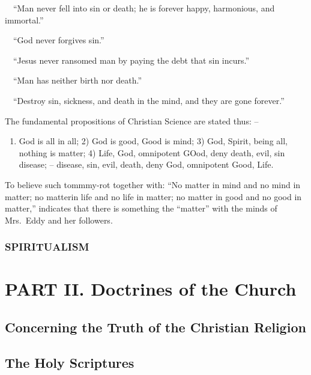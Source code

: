 \documentclass[
]{book}
\providecommand{\tightlist}{%
  \setlength{\itemsep}{0pt}\setlength{\parskip}{0pt}}
\begin{document}
~~``Man never fell into sin or death; he is forever happy, harmonious, and immortal.''

~~``God never forgives sin.''

~~``Jesus never ransomed man by paying the debt that sin incurs.''

~~``Man has neither birth nor death.''

~~``Destroy sin, sickness, and death in the mind, and they are gone forever.''

The fundamental propositions of Christian Science are stated thus: --

\begin{enumerate}
\def\labelenumi{\arabic{enumi})}
\tightlist
\item
  God is all in all; 2) God is good, Good is mind; 3) God, Spirit, being all, nothing is matter; 4) Life, God, omnipotent GOod, deny death, evil, sin disease; -- disease, sin, evil, death, deny God, omnipotent Good, Life.
\end{enumerate}

To believe such tommmy-rot together with: ``No matter in mind and no mind in matter; no matterin life and no life in matter; no matter in good and no good in matter,'' indicates that there is something the ``matter'' with the minds of Mrs.~Eddy and her followers.

\hypertarget{spiritualism}{%
\subsection{SPIRITUALISM}\label{spiritualism}}

\hypertarget{part-ii.-doctrines-of-the-church}{%
\chapter*{PART II. Doctrines of the Church}\label{part-ii.-doctrines-of-the-church}}

\hypertarget{concerning-the-truth-of-the-christian-religion}{%
\section{Concerning the Truth of the Christian Religion}\label{concerning-the-truth-of-the-christian-religion}}

\hypertarget{the-holy-scriptures}{%
\section{The Holy Scriptures}\label{the-holy-scriptures}}
\end{document}
